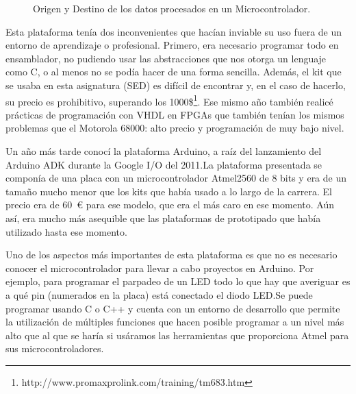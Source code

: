 \begin{figure}[H]
\begin{center}
\end{center}
\caption{Origen y Destino de los datos procesados en un Microcontrolador.}
\label{io_uc}
\end{figure}
Esta plataforma tenía dos inconvenientes que hacían inviable su uso fuera de un entorno de aprendizaje o profesional.  Primero, era necesario programar todo en ensamblador, no pudiendo usar las abstracciones que nos otorga un lenguaje como C, o al menos no se podía hacer de una forma sencilla.  Además, el kit que se usaba en esta asignatura (SED) es difícil de encontrar y, en el caso de hacerlo, su precio es prohibitivo, superando los 1000\$\footnote{http://www.promaxprolink.com/training/tm683.htm}.  Ese mismo año también realicé prácticas de programación con VHDL en FPGAs que también tenían los mismos problemas que el Motorola 68000: alto precio y programación de muy bajo nivel.

Un año más tarde conocí la plataforma Arduino, a raíz del lanzamiento del Arduino ADK durante la Google I/O del 2011.\@ La plataforma presentada se componía de una placa con un microcontrolador Atmel2560 de 8 bits y era de un tamaño mucho menor que los kits que había usado a lo largo de la carrera.  El precio era de 60~\euro{} para ese modelo, que era el más caro en ese momento. Aún así, era mucho más asequible que las plataformas de prototipado que había utilizado hasta ese momento.  

Uno de los aspectos más importantes de esta plataforma es que no es necesario conocer el microcontrolador para llevar a cabo proyectos en Arduino.  Por ejemplo, para programar el parpadeo de un LED todo lo que hay que averiguar es a qué pin (numerados en la placa) está conectado el diodo LED.\@ Se puede programar usando C o C++ y cuenta con un entorno de desarrollo que permite la utilización de múltiples funciones que hacen posible programar a un nivel más alto que al que se haría si usáramos las herramientas que proporciona Atmel para sus microcontroladores.  

